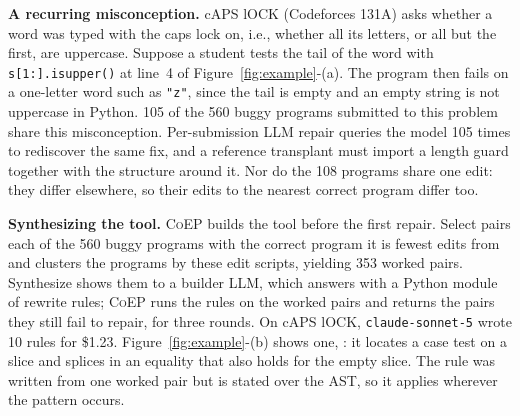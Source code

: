 \documentclass[acmsmall,screen,review,anonymous,nonacm]{acmart}
\newcommand{\tool}{\textsc{CoEP}\xspace}
\newcommand{\cs}{\texttt{claude-sonnet-5}\xspace}
\begin{document}
\textbf{A recurring misconception.} cAPS lOCK (Codeforces 131A) asks whether a word was typed with the caps lock on, i.e., whether all its letters, or all but the first, are uppercase. Suppose a student tests the tail of the word with \texttt{s[1:].isupper()} at line~4 of Figure~\ref{fig:example}-(a). The program then fails on a one-letter word such as \texttt{"z"}, since the tail is empty and an empty string is not uppercase in Python. 105 of the 560 buggy programs submitted to this problem share this misconception. Per-submission LLM repair queries the model 105 times to rediscover the same fix, and a reference transplant must import a length guard together with the structure around it. Nor do the 108 programs share one edit: they differ elsewhere, so their edits to the nearest correct program differ too.

\textbf{Synthesizing the tool.} \tool builds the tool before the first repair. Select pairs each of the 560 buggy programs with the correct program it is fewest edits from and clusters the programs by these edit scripts, yielding 353 worked pairs. Synthesize shows them to a builder LLM, which answers with a Python module of rewrite rules; \tool runs the rules on the worked pairs and returns the pairs they still fail to repair, for three rounds. On cAPS lOCK, \cs wrote 10 rules for \$1.23. Figure~\ref{fig:example}-(b) shows one, : it locates a case test on a slice and splices in an equality that also holds for the empty slice. The rule was written from one worked pair but is stated over the AST, so it applies wherever the pattern occurs.
\end{document}

